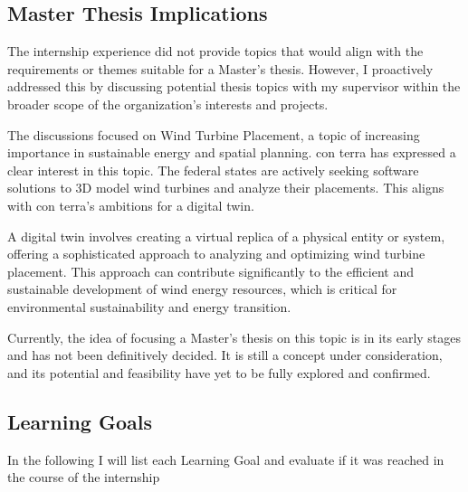\documentclass[11pt, titlepage, a4paper]{article}
\begin{document}
\subsection{Master Thesis Implications}
The internship experience did not provide topics that would align with the requirements or themes suitable for a Master's thesis. However, I proactively addressed this by discussing potential thesis topics with my supervisor within the broader scope of the organization's interests and projects.

The discussions focused on Wind Turbine Placement, a topic of increasing importance in sustainable energy and spatial planning. con terra has expressed a clear interest in this topic. The federal states are actively seeking software solutions to 3D model wind turbines and analyze their placements. This aligns with con terra's ambitions for a digital twin.

A digital twin involves creating a virtual replica of a physical entity or system, offering a sophisticated approach to analyzing and optimizing wind turbine placement. This approach can contribute significantly to the efficient and sustainable development of wind energy resources, which is critical for environmental sustainability and energy transition.

Currently, the idea of focusing a Master's thesis on this topic is in its early stages and has not been definitively decided. It is still a concept under consideration, and its potential and feasibility have yet to be fully explored and confirmed. %

\subsection{Learning Goals}
In the following I will list each Learning Goal and evaluate if it was reached in the course of the internship
\end{document}
